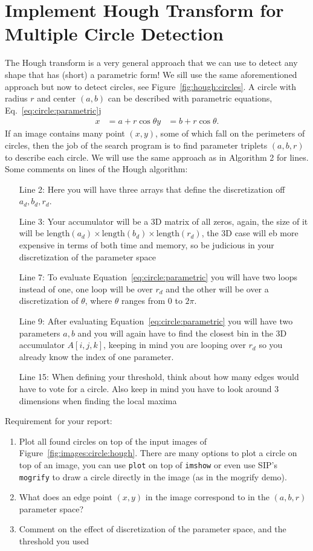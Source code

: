 \documentclass[a4paper]{article}
\begin{document}
\section{Implement Hough Transform for Multiple Circle Detection} The Hough transform is a very
general approach that we can use to detect any shape that has (short) a
parametric form! We sill use the same aforementioned approach but now to detect
circles, see Figure~\ref{fig:hough:circles}.  A circle with radius $r$ and
center $(a,b)$ can be described with parametric equations,
Eq.~\ref{eq:circle:parametric}j
\begin{align}\label{eq:circle:parametric}
x &= a + r\cos\theta
y &= b + r\cos\theta.
\end{align}
If an image contains many point $(x,y)$, some of which fall on the perimeters of
circles, then the job of the search program is to find parameter triplets
$(a,b,r)$ to describe each circle. We will use the same approach as in Algorithm
2 for lines.
Some comments on lines of the Hough algorithm:
\begin{itemize}
\item[Line 2:] Here you will have three arrays that define the discretization
off $a_d, b_d, r_d$.
\item[Line 3:] Your accumulator will be a 3D matrix of all zeros, again, the
size of it will be
$\text{length}(a_d)\times\text{length}(b_d)\times\text{length}(r_d)$, the 3D
case will eb more expensive in terms of both time and memory, so be
judicious in your discretization of the parameter space
\item[Line 7:] To evaluate Equation~\ref{eq:circle:parametric} you will have two
loops instead of one, one loop will be over $r_d$ and the other will be over a
discretization of $\theta$, where $\theta$ ranges from 0 to $2\pi$.
\item[Line 9:] After evaluating Equation~\ref{eq:circle:parametric} you will
have two parameters $a,b$ and you will again have to find the closest bin in the
3D accumulator $A[i,j,k]$, keeping in mind you are looping over $r_d$ so you
already know the index of one parameter.
\item[Line 15:] When defining your threshold, think about how many edges would
have to vote for a circle. Also keep in mind you have to look around 3
dimensions when finding the local maxima
\end{itemize}
Requirement for your report:
\begin{enumerate}
\item Plot all found circles on top of the input images of
Figure~\ref{fig:images:circle:hough}. There are many options to plot a circle on
top of an image, you can use \texttt{plot} on top of \texttt{imshow} or even use
SIP's \texttt{mogrify} to draw a circle directly in the image (as in the mogrify
demo).
\item What does an edge point $(x,y)$ in the image correspond to in the
$(a,b,r)$ parameter space?
\item Comment on the effect of discretization of the parameter space, and the
threshold you used
\end{enumerate}
\end{document}
